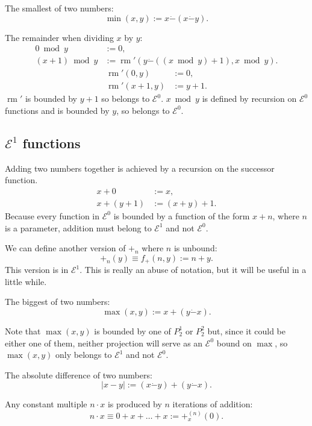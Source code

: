 \documentclass[a4paper]{article}
\newcommand{\grz}[1]{$\mathcal{E}^{#1}$}	%
\newcommand{\psub}{\dot -}	%
\newcommand{\recur}[1]{\begin{equation} \begin{split} #1 \end{split} \end{equation}}	%
\newcommand{\recurN}[1]{\begin{equation*} \begin{split} #1 \end{split} \end{equation*}}	%
\theoremstyle{plain}
\theoremstyle{definition}
\begin{document}
The smallest of two numbers:
\begin{equation} \min(x,y) := x \psub ( x \psub y). \end{equation}

The remainder when dividing $x$ by $y$:
\recur{
	0 \bmod{y} &:= 0,	\\
	(x+1) \bmod{y} &:= \operatorname{rm}' \left( y \psub \left( (x \bmod{y}) + 1 \right), x \bmod{y} \right).
	}
\recurN{
	\operatorname{rm}'(0,y) &:= 0, 	\\
	\operatorname{rm}'(x+1,y) &:= y+1.
}
$\operatorname{rm}'$ is bounded by $y+1$ so belongs to \grz{0}. $x \bmod{y}$ is defined by recursion on \grz{0} functions and is bounded by $y$, so belongs to \grz{0}.

\subsection{\grz{1} functions}
Adding two numbers together is achieved by a recursion on the successor function.
\recur{
	x + 0 &:= x,			\\
	x + (y+1) &:= (x+y) + 1.
}
Because every function in \grz{0} is bounded by a function of the form $x+n$, where $n$ is a parameter, addition must belong to \grz{1} and not \grz{0}.

We can define another version of $+_n$ where $n$ is unbound:
\begin{equation} +_n(y) \equiv f_{+}(n,y) := n + y. \end{equation}
This version is in \grz{1}. This is really an abuse of notation, but it will be useful in a little while.

The biggest of two numbers:
\begin{equation} \max(x,y) := x + (y \psub x). \end{equation}

Note that $\max(x,y)$ is bounded by one of $P_2^1$ or $P_2^2$ but, since it could be either one of them, neither projection will serve as an \grz{0} bound on $\max$, so $\max(x,y)$ only belongs to \grz{1} and not \grz{0}.

The absolute difference of two numbers:
\begin{equation} |x - y| := (x \psub y) + (y \psub x). \end{equation}

Any constant multiple $n \cdot x$ is produced by $n$ iterations of addition:
\begin{equation} n \cdot x  \equiv 0 + x + \dots + x := +_x^{(n)}(0). \end{equation}
\end{document}
